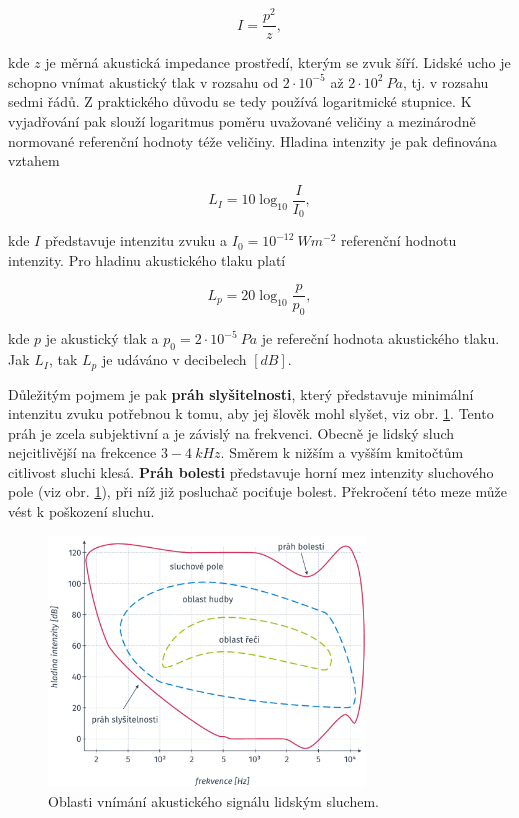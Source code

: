 \begin{equation}
  I = \frac{p^{2}}{z},
  \label{eq:asr:mfcc:intesity}
\end{equation}

\noindent kde $z$ je měrná akustická impedance prostředí, kterým se zvuk šíří. Lidské ucho je schopno vnímat akustický tlak v rozsahu od $2\cdot10^{-5}$ až $2\cdot10^{2}\ Pa$, tj. v rozsahu sedmi řádů. Z praktického důvodu se tedy používá logaritmické stupnice. K vyjadřování pak slouží logaritmus poměru uvažované veličiny a mezinárodně normované referenční hodnoty téže veličiny. \cite{Psutka2006} Hladina intenzity je pak definována vztahem

\begin{equation}
  L_{I} = 10\log_{10}\frac{I}{I_{0}},
  \label{eq:asr:mfcc:intesity:level}
\end{equation}

\noindent kde $I$ představuje intenzitu zvuku a $I_{0} = 10^{-12}\ Wm^{-2}$ referenční hodnotu intenzity. Pro hladinu akustického tlaku platí

\begin{equation}
  L_{p} = 20\log_{10}\frac{p}{p_{0}},
  \label{eq:asr:mfcc:pressure:level}
\end{equation}

\noindent kde $p$ je akustický tlak a $p_{0} = 2\cdot10^{-5}\ Pa$ je refereční hodnota akustického tlaku. Jak $L_{I}$, tak $L_{p}$ je udáváno v decibelech $\left[dB\right]$.

Důležitým pojmem je pak \textbf{práh slyšitelnosti}, který představuje minimální intenzitu zvuku potřebnou k tomu, aby jej šlověk mohl slyšet, viz obr. \ref{fig:asr:mfcc:acoustic:characteristic}. Tento práh je zcela subjektivní a je závislý na frekvenci. Obecně je lidský sluch nejcitlivější na frekcence $3 - 4\ kHz$. Směrem k nižším a vyšším kmitočtům citlivost sluchi klesá. \textbf{Práh bolesti} představuje horní mez intenzity sluchového pole (viz obr. \ref{fig:asr:mfcc:acoustic:characteristic}), při níž již posluchač pociťuje bolest. Překročení této meze může vést k poškození sluchu. \cite{Holmes2001}

\begin{figure}[hbpt]
  \centering
  \includegraphics[width=0.75\textwidth]{./ch4-asr/img/listening_perception.pdf}
  \caption{Oblasti vnímání akustického signálu lidským sluchem.}
  \label{fig:asr:mfcc:acoustic:characteristic}
\end{figure}

